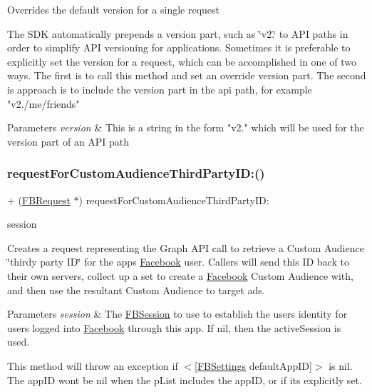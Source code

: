 Overrides the default version for a single request

The S\+DK automatically prepends a version part, such as \char`\"{}v2.\char`\"{} to A\+PI paths in order to simplify A\+PI versioning for applications. Sometimes it is preferable to explicitly set the version for a request, which can be accomplished in one of two ways. The first is to call this method and set an override version part. The second is approach is to include the version part in the api path, for example "v2./me/friends"


\begin{DoxyParams}{Parameters}
{\em version} & This is a string in the form "v2." which will be used for the version part of an A\+PI path \\
\hline
\end{DoxyParams}
\mbox{\label{interfaceFBRequest_a17f11f5dad042b4109b3a001300d6916}} 
\subsubsection{\texorpdfstring{request\+For\+Custom\+Audience\+Third\+Party\+I\+D\+:()}{requestForCustomAudienceThirdPartyID:()}\hspace{0.1cm}{\footnotesize\ttfamily [1/5]}}
{\footnotesize\ttfamily + (\hyperlink{interfaceFBRequest}{F\+B\+Request} $\ast$) request\+For\+Custom\+Audience\+Third\+Party\+I\+D\+: \begin{DoxyParamCaption}\item[{(\hyperlink{interfaceFBSession}{F\+B\+Session} $\ast$)}]{session }\end{DoxyParamCaption}}

Creates a request representing the Graph A\+PI call to retrieve a Custom Audience \char`\"{}thirdy party I\+D\char`\"{} for the app\textquotesingle{}s \hyperlink{interfaceFacebook}{Facebook} user. Callers will send this ID back to their own servers, collect up a set to create a \hyperlink{interfaceFacebook}{Facebook} Custom Audience with, and then use the resultant Custom Audience to target ads.


\begin{DoxyParams}{Parameters}
{\em session} & The \hyperlink{interfaceFBSession}{F\+B\+Session} to use to establish the user\textquotesingle{}s identity for users logged into \hyperlink{interfaceFacebook}{Facebook} through this app. If {\ttfamily nil}, then the active\+Session is used.\\
\hline
\end{DoxyParams}
This method will throw an exception if $<$\mbox{[}\hyperlink{interfaceFBSettings}{F\+B\+Settings} default\+App\+ID\mbox{]}$>$ is {\ttfamily nil}. The app\+ID won\textquotesingle{}t be nil when the p\+List includes the app\+ID, or if it\textquotesingle{}s explicitly set.

